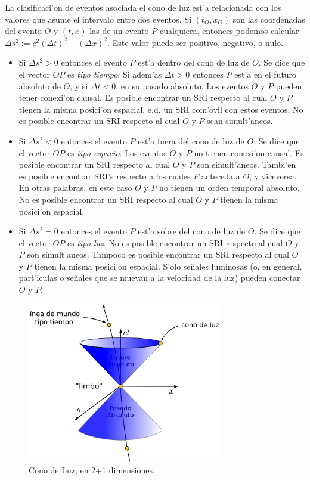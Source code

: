 La clasificaci'on de eventos asociada el cono de luz est'a relacionada con los valores que asume el intervalo entre dos eventos. Si $(t_O,x_O)$ son las coordenadas del evento $O$ y $(t,x)$ las de un evento $P$ cualquiera, entonces podemos calcular $\Delta s^2:=c^2(\Delta t)^2-(\Delta x)^2$. Este valor puede ser positivo, negativo, o nulo.
\begin{itemize}
\item Si $\Delta s^2>0$ entonces el evento $P$ est'a dentro del cono de luz de $O$. Se dice que el vector $OP$ es \textit{tipo tiempo}. Si adem'as $\Delta t>0$ entonces $P$ est'a en el futuro absoluto de $O$, y si $\Delta t<0$, en su pasado absoluto. Los eventos $O$ y $P$ pueden tener conexi'on causal. Es posible encontrar un SRI respecto al cual $O$ y $P$ tienen la misma posici'on espacial, e.d. un SRI com'ovil con estos eventos. No es posible encontrar un SRI respecto al cual $O$ y $P$ sean simult'aneos.

\item Si $\Delta s^2<0$ entonces el evento $P$ est'a fuera del cono de luz de $O$. Se dice que el vector $OP$ es \textit{tipo espacio}. Los eventos $O$ y $P$ no tienen conexi'on causal. Es posible encontrar un SRI respecto al cual $O$ y $P$ son simult'aneos. Tambi'en es posible encontrar SRI's respecto a los cuales $P$ anteceda a $O$, y viceversa. En otras palabras, en este caso $O$ y $P$ no tienen un orden temporal absoluto. No es posible encontrar un SRI respecto al cual $O$ y $P$ tienen la misma posici'on espacial.

\item Si $\Delta s^2=0$ entonces el evento $P$ est'a sobre del cono de luz de $O$. Se dice que el vector $OP$ es \textit{tipo luz}. No es posible encontrar un SRI respecto al cual $O$ y $P$ son  simult'aneos. Tampoco es posible encontrar un SRI respecto al cual $O$ y $P$ tienen la misma posici'on espacial. S'olo se\~nales luminosas (o, en general, part'iculas o se\~nales que se muevan a la velocidad de la luz) pueden conectar $O$ y $P$.
\end{itemize}

\begin{figure}[t]
\centering\includegraphics[height=7cm]{fig/fig-cono-de-luz-2D.pdf}
\caption{Cono de Luz, en 2+1 dimensiones.}
\end{figure}



